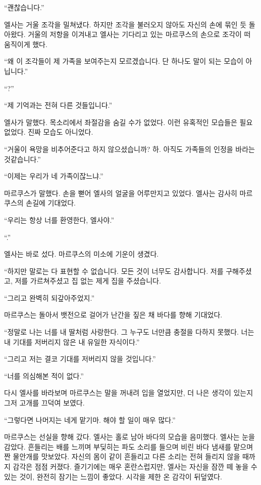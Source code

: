 ``괜찮습니다.''

엘사는 거울 조각을 밀쳐냈다. 하지만 조각을 불러오지 않아도 자신의 손에 묶인 듯 돌아왔다. 거울의 저항을 이겨내고 엘사는 기다리고 있는 마르쿠스의 손으로 조각이 떠 움직이게 했다.

``왜 이 조각들이 제 가족을 보여주는지 모르겠습니다. 단 하나도 말이 되는 모습이 아닙니다.''

``?''

``제 기억과는 전혀 다른 것들입니다.''

엘사가 말했다. 목소리에서 좌절감을 숨길 수가 없었다. 이런 유혹적인 모습들은 필요 없었다. 진짜 모습도 아니었다.

``거울이 욕망을 비추어준다고 하지 않으셨습니까? 하. 아직도 가족들의 인정을 바라는 것같습니다.''

``이제는 우리가 네 가족이잖느냐.''

마르쿠스가 말했다. 손을 뻗어 엘사의 얼굴을 어루만지고 있었다. 엘사는 감사히 마르쿠스의 손길에 기대었다.

``우리는 항상 너를 환영한다, 엘사야.''

``.''

엘사는 바로 섰다. 마르쿠스의 미소에 기운이 생겼다.

``하지만 말로는 다 표현할 수 없습니다. 모든 것이 너무도 감사합니다. 저를 구해주셨고, 저를 가르쳐주셨고 집 없는 제게 집을 주셨습니다.

``그리고 완벽히 되갚아주었지.'' %

마르쿠스는 돌아서 뱃전으로 걸어가 난간을 짚은 채 바다를 향해 기대었다.

``정말로 나는 너를 내 딸처럼 사랑한다. 그 누구도 너만큼 충절을 다하지 못했다. 너는 내 기대를 저버리지 않은 내 유일한 자식이다.''

``그리고 저는 결코 기대를 저버리지 않을 것입니다.''

`` 너를 의심해본 적이 없다.''

다시 엘사를 바라보며 마르쿠스는 말을 꺼내려 입을 열었지만, 더 나은 생각이 있는지 그저 고개를 끄덕여 보였다.

``그렇다면 나머지는 네게 맡기마. 해야 할 일이 매우 많다.''

마르쿠스는 선실을 향해 갔다. 엘사는 홀로 남아 바다의 모습을 음미했다. 엘사는 눈을 감았다. 흔들리는 배를 느끼며 부딪히는 파도 소리를 들으며 비린 바다 냄새를 맡으며 짠 물안개를 맛보았다. 자신의 몸이 같이 흔들리고 다른 소리는 전혀 들리지 않을 때까지 감각은 점점 커졌다. 즐기기에는 매우 혼란스럽지만, 엘사는 자신을 잠깐 떼 놓을 수 있는 것이, 완전히 잠기는 느낌이 좋았다. 시각을 제한 온 감각이 뒤덮였다. %


